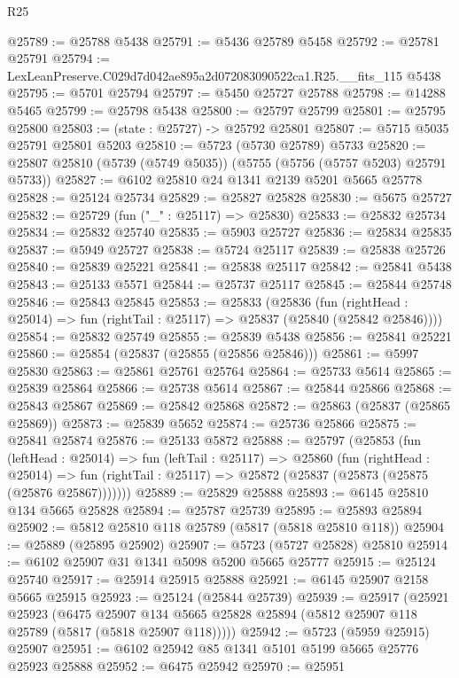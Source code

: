 \begin{lexlean}{R25}
\begin{coremodule}
@25789 := @25788 @5438
@25791 := @5436 @25789 @5458
@25792 := @25781 @25791
@25794 := LexLeanPreserve.C029d7d042ae895a2d072083090522ca1.R25.__fits_115 @5438
@25795 := @5701 @25794
@25797 := @5450 @25727 @25788
@25798 := @14288 @5465
@25799 := @25798 @5438
@25800 := @25797 @25799
@25801 := @25795 @25800
@25803 := (state : @25727) -> @25792 @25801
@25807 := @5715 @5035 @25791 @25801 @5203
@25810 := @5723 (@5730 @25789) @5733
@25820 := @25807 @25810 (@5739 (@5749 @5035)) (@5755 (@5756 (@5757 @5203) @25791 @5733))
@25827 := @6102 @25810 @24 @1341 @2139 @5201 @5665 @25778
@25828 := @25124 @25734
@25829 := @25827 @25828
@25830 := @5675 @25727
@25832 := @25729 (fun ("_" : @25117) => @25830)
@25833 := @25832 @25734
@25834 := @25832 @25740
@25835 := @5903 @25727
@25836 := @25834 @25835
@25837 := @5949 @25727
@25838 := @5724 @25117
@25839 := @25838 @25726
@25840 := @25839 @25221
@25841 := @25838 @25117
@25842 := @25841 @5438
@25843 := @25133 @5571
@25844 := @25737 @25117
@25845 := @25844 @25748
@25846 := @25843 @25845
@25853 := @25833
    (@25836
      (fun (rightHead : @25014) => fun (rightTail : @25117) => @25837 (@25840 (@25842 @25846))))
@25854 := @25832 @25749
@25855 := @25839 @5438
@25856 := @25841 @25221
@25860 := @25854 (@25837 (@25855 (@25856 @25846)))
@25861 := @5997 @25830
@25863 := @25861 @25761 @25764
@25864 := @25733 @5614
@25865 := @25839 @25864
@25866 := @25738 @5614
@25867 := @25844 @25866
@25868 := @25843 @25867
@25869 := @25842 @25868
@25872 := @25863 (@25837 (@25865 @25869))
@25873 := @25839 @5652
@25874 := @25736 @25866
@25875 := @25841 @25874
@25876 := @25133 @5872
@25888 := @25797
    (@25853
      (fun (leftHead : @25014) =>
      fun (leftTail : @25117) =>
      @25860
        (fun (rightHead : @25014) =>
        fun (rightTail : @25117) => @25872 (@25837 (@25873 (@25875 (@25876 @25867)))))))
@25889 := @25829 @25888
@25893 := @6145 @25810 @134 @5665 @25828
@25894 := @25787 @25739
@25895 := @25893 @25894
@25902 := @5812 @25810 @118 @25789 (@5817 (@5818 @25810 @118))
@25904 := @25889 (@25895 @25902)
@25907 := @5723 (@5727 @25828) @25810
@25914 := @6102 @25907 @31 @1341 @5098 @5200 @5665 @25777
@25915 := @25124 @25740
@25917 := @25914 @25915 @25888
@25921 := @6145 @25907 @2158 @5665 @25915
@25923 := @25124 (@25844 @25739)
@25939 := @25917
    (@25921
      @25923
      (@6475
        @25907
        @134
        @5665
        @25828
        @25894
        (@5812 @25907 @118 @25789 (@5817 (@5818 @25907 @118)))))
@25942 := @5723 (@5959 @25915) @25907
@25951 := @6102 @25942 @85 @1341 @5101 @5199 @5665 @25776 @25923 @25888
@25952 := @6475 @25942
@25970 := @25951

\end{coremodule}
\end{lexlean}

